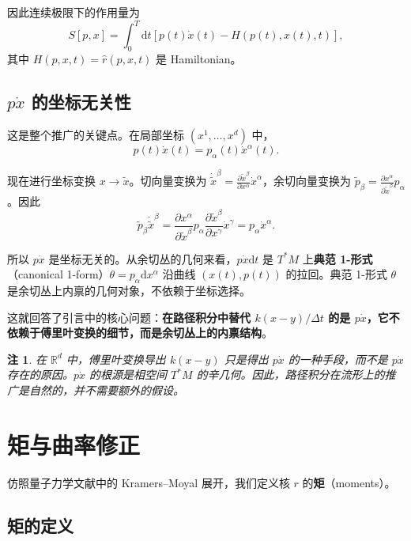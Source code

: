 \documentclass{book}
\newcommand{\mathd}{\mathrm{d}}
\newtheorem{remark}{注}[chapter]
\begin{document}
因此连续极限下的作用量为
\begin{equation}
  S[p,x] = \int_0^T \mathd t \left[ p(t) \dot{x}(t) - H(p(t), x(t), t) \right], \label{eq:S-cont}
\end{equation}
其中 $H(p,x,t) = \hat{r}(p,x,t)$ 是 Hamiltonian。

\section{$p\dot{x}$ 的坐标无关性}

这是整个推广的关键点。在局部坐标 $(x^1,\ldots,x^d)$ 中，
\[
p(t) \dot{x}(t) = p_\alpha(t) \dot{x}^\alpha(t).
\]

现在进行坐标变换 $x \to \tilde x$。切向量变换为 $\dot{\tilde x}^\beta = \frac{\partial \tilde x^\beta}{\partial x^\alpha} \dot{x}^\alpha$，余切向量变换为 $\tilde p_\beta = \frac{\partial x^\alpha}{\partial \tilde x^\beta} p_\alpha$。因此
\[
\tilde p_\beta \dot{\tilde x}^\beta = \frac{\partial x^\alpha}{\partial \tilde x^\beta} p_\alpha \frac{\partial \tilde x^\beta}{\partial x^\gamma} \dot{x}^\gamma = p_\alpha \dot{x}^\alpha.
\]

所以 $p\dot{x}$ 是坐标无关的。从余切丛的几何来看，$p\dot{x}\mathd t$ 是 $T^*M$ 上\textbf{典范 1-形式}（canonical 1-form）$\theta = p_\alpha \mathd x^\alpha$ 沿曲线 $(x(t), p(t))$ 的拉回。典范 1-形式 $\theta$ 是余切丛上内禀的几何对象，不依赖于坐标选择。

这就回答了引言中的核心问题：\textbf{在路径积分中替代 $k(x-y)/\Delta t$ 的是 $p\dot{x}$，它不依赖于傅里叶变换的细节，而是余切丛上的内禀结构}。

\begin{remark}
  在 $\mathbb{R}^d$ 中，傅里叶变换导出 $k(x-y)$ 只是得出 $p\dot{x}$ 的一种手段，而不是 $p\dot{x}$ 存在的原因。$p\dot{x}$ 的根源是相空间 $T^*M$ 的辛几何。因此，路径积分在流形上的推广是自然的，并不需要额外的假设。
\end{remark}

\chapter{矩与曲率修正}\label{sec:moments}

仿照量子力学文献中的 Kramers--Moyal 展开，我们定义核 $r$ 的\textbf{矩}（moments）。

\section{矩的定义}
\end{document}
